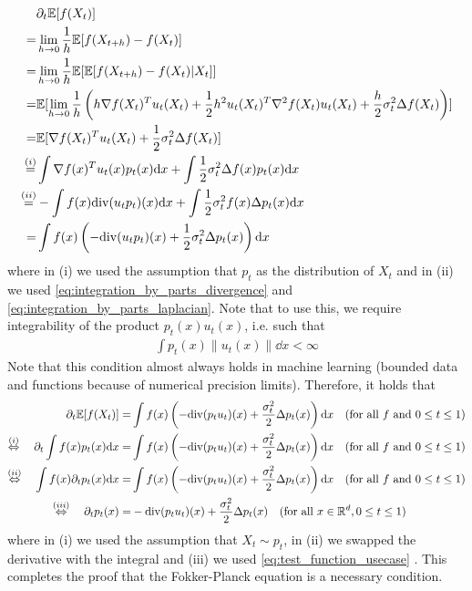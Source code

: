 \begin{align*}
&\partial_t \mathbb{E}[f(X_t)]\\
=&\lim\limits_{h\to 0}
\frac{1}{h}\mathbb{E}[f(X_{t+h})-f(X_t)]\\
=&\lim\limits_{h\to 0}
\frac{1}{h}\mathbb{E}[\mathbb{E}[f(X_{t+h})-f(X_t)|X_t]]\\
=&\mathbb{E}[\lim\limits_{h\to 0}\frac{1}{h}\left(
h\nabla f(X_t)^Tu_t(X_t)+\frac{1}{2}h^2u_t(X_t)^T\nabla^2 f(X_t)u_t(X_t)+\frac{h}{2}\sigma_t^2\Delta f(X_t)
\right)]\\
=&\mathbb{E}[\nabla f(X_t)^Tu_t(X_t)+\frac{1}{2}\sigma_t^2\Delta f(X_t)]\\
\overset{(i)}{=}&\int \nabla f(x)^Tu_t(x)p_t(x)\mathrm{d} x+\int \frac{1}{2}\sigma_t^2\Delta f(x)p_t(x)\mathrm{d} x\\
\overset{(ii)}{=}&-\int f(x)\mathrm{div}(u_t p_t)(x)\mathrm{d} x+\int \frac{1}{2}\sigma_t^2 f(x)\Delta p_t(x)\mathrm{d} x\\
=&\int f(x)\left(-\mathrm{div}(u_t p_t)(x)+\frac{1}{2}\sigma_t^2\Delta p_t(x)\right)\mathrm{d} x
\end{align*}
where in (i) we used the assumption that $p_t$ as the distribution of $X_t$ and in (ii) we used \cref{eq:integration_by_parts_divergence} and \cref{eq:integration_by_parts_laplacian}. Note that to use this, we require integrability of the product $p_t(x)u_t(x)$, i.e. such that 
\begin{align*}
\int p_t(x)\|u_t(x)\|\dd x <\infty
\end{align*}
Note that this condition almost always holds in machine learning (bounded data and functions because of numerical precision limits). Therefore, it holds that
\begin{align}
\partial_t\mathbb{E}[f(X_t)] =& \int f(x)\left(-\mathrm{div} (p_t u_t)(x)+\frac{\sigma_t^2}{2}\Delta p_t (x)\right)\mathrm{d} x\quad (\text{for all }f\text{ and }0\leq t\leq 1)\\
\overset{(i)}{\Leftrightarrow}\quad \partial_t\int f(x) p_t(x)\mathrm{d} x =& \int f(x)\left(-\mathrm{div} (p_tu_t)(x)+\frac{\sigma_t^2}{2}\Delta p_t (x)\right)\mathrm{d} x\quad (\text{for all }f\text{ and }0\leq t\leq 1)\\
\overset{(ii)}{\Leftrightarrow}\quad \int f(x)\partial_t p_t(x)\mathrm{d} x =& \int f(x)\left(-\mathrm{div} (p_t u_t)(x)+\frac{\sigma_t^2}{2}\Delta p_t (x)\right)\mathrm{d} x\quad (\text{for all }f\text{ and }0\leq t\leq 1)\\
\overset{(iii)}{\Leftrightarrow}\quad \partial_t p_t(x) =& -\mathrm{div} (p_t u_t)(x)+\frac{\sigma_t^2}{2}\Delta p_t(x)\quad (\text{for all }x\in\mathbb{R}^d, 0\leq t\leq 1)
\end{align} 
where in (i) we used the assumption that $X_t\sim p_t$, in (ii) we swapped the derivative with the integral and (iii) we used \cref{eq:test_function_usecase}
. This completes the proof that the Fokker-Planck equation is a necessary condition.\\

